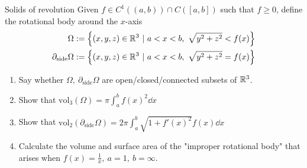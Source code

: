 \documentclass[12pt]{article}
\begin{document}
\begin{problem}{Solids of revolution}{}
    Given $f \in C^1((a, b)) \cap C([a, b])$ such that $f \geq 0$, define the rotational body around the $x$-axis
    \begin{align*}
        \Omega := \left\{ (x, y, z) \in \R^3 \ |\ a < x < b,\ \sqrt{y^2 + z^2} < f(x) \right\} \\
        \partial_{\text{side}}\Omega := \left\{ (x, y, z) \in \R^3 \ |\ a < x < b,\ \sqrt{y^2 + z^2} = f(x) \right\}
    \end{align*}

    \begin{enumerate}
        \item Say whether $\Omega,\ \partial_{\text{side}}\Omega$ are open/closed/connected subsets of $\mathbb{R}^3$.
        \item Show that $\mathrm{vol}_3(\Omega) = \pi \int_{a}^{b} f(x)^2 \dd x$
        \item Show that $\mathrm{vol}_2(\partial_{\text{side}}\Omega) = 2\pi\int_{a}^{b} \sqrt{1 + f'(x)^2}f(x) \dd x$
        \item Calculate the volume and surface area of the "improper rotational body" that arises when $f(x) = \frac{1}{x},\ a = 1,\ b = \infty$.
    \end{enumerate}
\end{problem}
\end{document}
